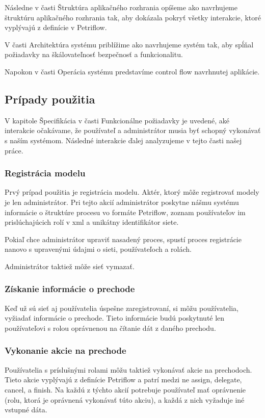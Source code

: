 Následne v časti Štruktúra aplikačného rozhrania opíšeme ako navrhujeme štruktúru aplikačného rozhrania tak, aby dokázala pokryť všetky interakcie, ktoré vyplývajú z definície v Petriflow. 

V časti Architektúra systému priblížime ako navrhujeme systém tak, aby spĺňal požiadavky na škálovateľnosť bezpečnosť a funkcionalitu.

Napokon v časti Operácia systému predstavíme control flow navrhnutej aplikácie.


\subsection{Prípady použitia} \label{usecases}
V kapitole Špecifikácia v časti Funkcionálne požiadavky je uvedené, aké interakcie očakávame, že používateľ a administrátor musia byť schopný vykonávať s naším systémom. Následné interakcie ďalej analyzujeme v tejto časti našej práce. 

\subsubsection{Registrácia modelu}
Prvý prípad použitia je registrácia modelu. Aktér, ktorý môže registrovať modely je len administrátor. Pri tejto akcií administrátor poskytne nášmu systému informácie o štruktúre procesu vo formáte Petriflow, zoznam používateľov im prislúchajúcich rolí v \acrshort{xml} a unikátny identifikátor siete.

Pokiaľ chce administrátor upraviť nasadený proces, spustí proces registrácie nanovo s upravenými údajmi o sieti, používateľoch a rolách.

Administrátor taktiež môže sieť vymazať.

\subsubsection{Získanie informácie o prechode}
Keď už sú sieť aj používatelia úspešne zaregistrovaní, si môžu používatelia, vyžiadať informácie o prechode. Tieto informácie budú poskytnuté len používateľovi s rolou oprávnenou na čítanie dát z daného prechodu.

\subsubsection{Vykonanie akcie na prechode}
Používatelia s príslušnými rolami môžu taktiež vykonávať akcie na prechodoch. Tieto akcie vyplývajú z definície Petriflow a patrí medzi ne assign, delegate, cancel, a finish. Na každú z týchto akcií potrebuje používateľ mať oprávnenie (rolu, ktorá je oprávnená vykonávať túto akciu), a každá z nich vyžaduje iné vstupné dáta.

